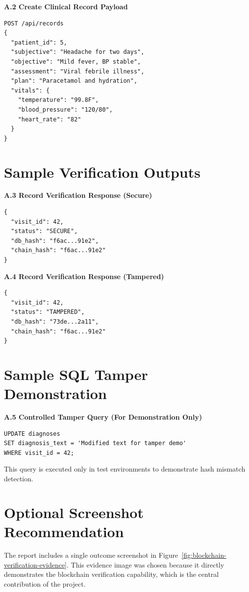 \documentclass[12pt,a4paper]{report}
\begin{document}
\textbf{A.2 Create Clinical Record Payload}

\begin{verbatim}
POST /api/records
{
  "patient_id": 5,
  "subjective": "Headache for two days",
  "objective": "Mild fever, BP stable",
  "assessment": "Viral febrile illness",
  "plan": "Paracetamol and hydration",
  "vitals": {
    "temperature": "99.8F",
    "blood_pressure": "120/80",
    "heart_rate": "82"
  }
}
\end{verbatim}

\section{Sample Verification Outputs}

\textbf{A.3 Record Verification Response (Secure)}

\begin{verbatim}
{
  "visit_id": 42,
  "status": "SECURE",
  "db_hash": "f6ac...91e2",
  "chain_hash": "f6ac...91e2"
}
\end{verbatim}

\textbf{A.4 Record Verification Response (Tampered)}

\begin{verbatim}
{
  "visit_id": 42,
  "status": "TAMPERED",
  "db_hash": "73de...2a11",
  "chain_hash": "f6ac...91e2"
}
\end{verbatim}

\section{Sample SQL Tamper Demonstration}

\textbf{A.5 Controlled Tamper Query (For Demonstration Only)}

\begin{verbatim}
UPDATE diagnoses
SET diagnosis_text = 'Modified text for tamper demo'
WHERE visit_id = 42;
\end{verbatim}

This query is executed only in test environments to demonstrate hash mismatch detection.

\section{Optional Screenshot Recommendation}

The report includes a single outcome screenshot in Figure~\ref{fig:blockchain-verification-evidence}.
This evidence image was chosen because it directly demonstrates the blockchain verification capability,
which is the central contribution of the project.
\end{document}
